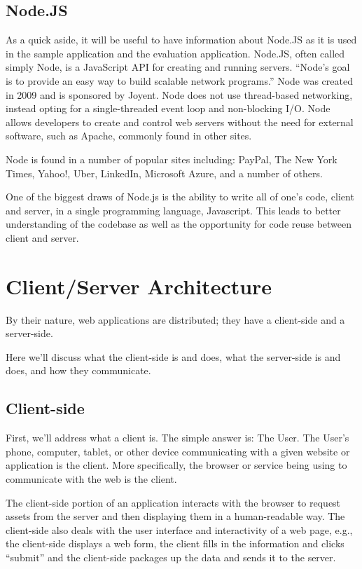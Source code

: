\documentclass[12pt]{ucthesis}
\begin{document}
\subsection{Node.JS}
As a quick aside, it will be useful to have information about Node.JS as it is used in the sample application and the evaluation application. Node.JS, often called simply Node, is a JavaScript API for creating and running servers. ``Node's goal is to provide an easy way to build scalable network programs.'' \cite{Node} Node was created in 2009 and is sponsored by Joyent. Node does not use thread-based networking, instead opting for a single-threaded event loop and non-blocking I/O. Node allows developers to create and control web servers without the need for external software, such as Apache, commonly found in other sites.

Node is found in a number of popular sites including: PayPal, The New York Times, Yahoo!, Uber, LinkedIn, Microsoft Azure, and a number of others. \cite{Node}

One of the biggest draws of Node.js is the ability to write all of one's code, client and server, in a single programming language, Javascript. This leads to better understanding of the codebase as well as the opportunity for code reuse between client and server.

\section{Client/Server Architecture}
By their nature, web applications are distributed; they have a client-side and a server-side.

Here we'll discuss what the client-side is and does, what the server-side is and does, and how they communicate.

\subsection{Client-side}
First, we'll address what a client is. The simple answer is: The User. The User's phone, computer, tablet, or other device communicating with a given website or application is the client. More specifically, the browser or service being using to communicate with the web is the client. 

The client-side portion of an application interacts with the browser to request assets from the server and then displaying them in a human-readable way. The client-side also deals with the user interface and interactivity of a web page, e.g., the client-side displays a web form, the client fills in the information and clicks ``submit'' and the client-side packages up the data and sends it to the server.
\end{document}
